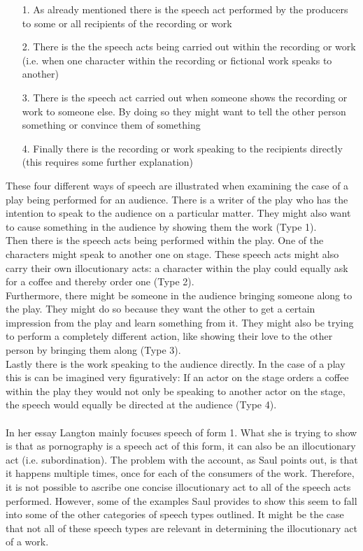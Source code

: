 \documentclass[14pt]{article}
\begin{document}
\begin{enumerate}
  \item[1.] As already mentioned there is the speech act performed by the producers to some or all recipients of the recording or work
  \item[2.] There is the the speech acts being carried out within the recording or work (i.e. when one character within the recording or fictional work speaks to another)
  \item[3.] There is the speech act carried out when someone shows the recording or work to someone else. 
  By doing so they might want to tell the other person something or convince them of something
  \item[4.] Finally there is the recording or work speaking to the recipients directly (this requires some further explanation) 
\end{enumerate}

These four different ways of speech are illustrated when examining the case of a play being performed for an audience. There is a writer of the play who has the
intention to speak to the audience on a particular matter. They might also want to cause something in the audience by showing them the work (Type 1).\\
Then there is the speech
acts being performed within the play. One of the characters might speak to another one on stage. 
These speech acts might also carry their own illocutionary acts: a character
within the play could equally ask for a coffee and thereby order one (Type 2).\\
Furthermore, there might be someone 
in the audience bringing someone along to the play. They might
do so because they want the other to get a certain impression from the play and learn something from it. 
They might also be trying to perform a completely different action,
like showing their love to the other person by bringing them along (Type 3).\\
Lastly there is the work speaking to the audience directly. In the case of a play this is can be imagined very figuratively: 
If an actor on the stage orders a coffee
within the play they would not only be speaking to another actor on the stage, the speech would equally be directed at the audience (Type 4).\\
\\

In her essay Langton mainly focuses speech of form 1. What she is trying to show is that as pornography is a speech act of this form, it can also be an illocutionary act
(i.e. subordination). The problem with the account, as Saul points out, is that it happens multiple times, once for each of the consumers of the work. Therefore, 
it is not possible to ascribe one concise illocutionary act to all of the speech acts performed. However, some of the examples Saul provides to show this seem to fall into
some of the other categories of speech types outlined. It might be the case that not all of these speech types are relevant in determining the illocutionary act
of a work. \\
\end{document}

